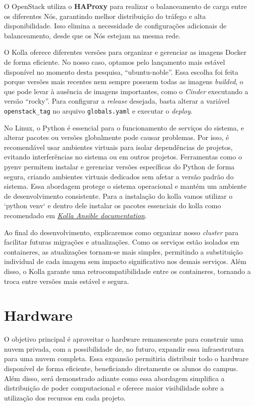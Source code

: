O OpenStack utiliza o \textbf{HAProxy} para realizar o balanceamento de carga entre os diferentes Nós, garantindo melhor distribuição do tráfego e alta disponibilidade. Isso elimina a necessidade de configurações adicionais de balanceamento, desde que os Nós estejam na mesma rede.

O Kolla oferece diferentes versões para organizar e gerenciar as imagens Docker de forma eficiente. No nosso caso, optamos pelo lançamento mais estável disponível no momento desta pesquisa, ``ubuntu-noble''. Essa escolha foi feita porque versões mais recentes nem sempre possuem todas as imagens \textit{builded}, o que pode levar à ausência de imagens importantes, como o \textit{Cinder} executando a versão ``rocky''. Para configurar a \textit{release} desejada, basta alterar a variável \texttt{openstack\_tag} no arquivo \texttt{globals.yaml} e executar o \textit{deploy}.

No Linux, o Python é essencial para o funcionamento de serviços do sistema, e alterar pacotes ou versões globalmente pode causar problemas. Por isso, é recomendável usar ambientes virtuais para isolar dependências de projetos, evitando interferências no sistema ou em outros projetos. Ferramentas como o pyenv permitem instalar e gerenciar versões específicas do Python de forma segura, criando ambientes virtuais dedicados sem afetar a versão padrão do sistema. Essa abordagem protege o sistema operacional e mantém um ambiente de desenvolvimento consistente. Para a instalação do kolla vamos utilizar o `python venv` e dentro dele instalar os pacotes essenciais do kolla como recomendado em \textit{\href{https://docs.openstack.org/kolla-ansible/latest/user/quickstart.html}{Kolla Ansible documentation}}.

Ao final do desenvolvimento, explicaremos como organizar nosso \textit{cluster} para facilitar futuras migrações e atualizações. Como os serviços estão isolados em containeres, as atualizações tornam-se mais simples, permitindo a substituição individual de cada imagem sem impacto significativo nos demais serviços. Além disso, o Kolla garante uma retrocompatibilidade entre os containeres, tornando a troca entre versões mais estável e segura.


\section{Hardware}

O objetivo principal é aproveitar o hardware remanescente para construir uma nuvem privada, com a possibilidade de, no futuro, expandir essa infraestrutura para uma nuvem completa. Essa expansão permitiria distribuir todo o hardware disponível de forma eficiente, beneficiando diretamente os alunos do campus. Além disso, será demonstrado adiante como essa abordagem simplifica a distribuição de poder computacional e oferece maior visibilidade sobre a utilização dos recursos em cada projeto.


